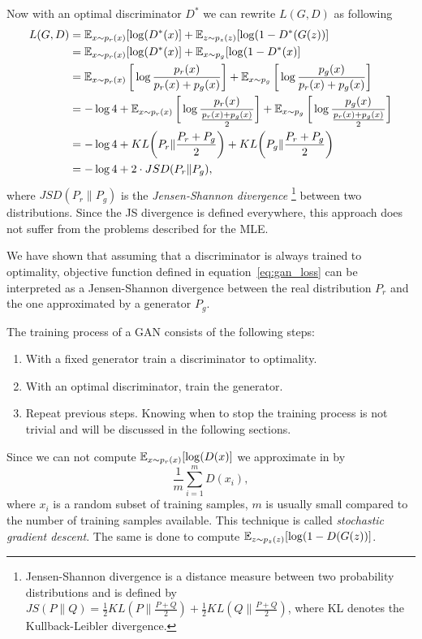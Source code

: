 Now with an optimal discriminator $D^*$ we can rewrite $L(G,D)$ as following
\begin{align*}
	L(G, D) &= \operatorname{\mathbb{E}}_{x \sim p_r(x)} [\log(D^*(x)] + \operatorname{\mathbb{E}}_{z \sim p_z(z)}[\log(1-D^*(G(z))] \\
	&= \operatorname{\mathbb{E}}_{x \sim p_r(x)} [\log(D^*(x)] + \operatorname{\mathbb{E}}_{x \sim p_g}[\log(1-D^*(x)] \\
	&= \operatorname{\mathbb{E}}_{x \sim p_r(x)} \bigg[\log \frac{p_r(x)}{p_r(x) + p_g(x)}\bigg] + \operatorname{\mathbb{E}}_{x \sim p_g}\bigg[\log \frac{p_g(x)}{p_r(x) + p_g(x)}\bigg] \\
	&= -\log 4 + \operatorname{\mathbb{E}}_{x \sim p_r(x)} \bigg[\log \frac{p_r(x)}{\frac{p_r(x) + p_g(x)}{2}}\bigg] + \operatorname{\mathbb{E}}_{x \sim p_g}\bigg[\log \frac{p_g(x)}{\frac{p_r(x) + p_g(x)}{2}}\bigg] \\
	&= -\log 4 + KL\bigg(P_r \lVert \frac{P_r + P_g}{2}\bigg) +  KL\bigg(P_g \lVert \frac{P_r + P_g}{2}\bigg) \\
	&= -\log 4 + 2 \cdot JSD(P_r \lVert P_g),
\end{align*}
where $JSD(P_r \lVert P_g)$ is the \textit{Jensen-Shannon divergence}  \footnote{Jensen-Shannon divergence is a distance measure between two probability distributions and is defined by $JS(P\lVert Q) = \frac{1}{2} KL(P \lVert \frac{P+Q}{2}) +\frac{1}{2} KL(Q \lVert \frac{P+Q}{2})$, where KL denotes the Kullback-Leibler divergence.} between two distributions. Since the JS divergence is defined everywhere, this approach does not suffer from the problems described for the MLE.

We have shown that assuming that a discriminator is always trained to optimality, objective function defined in equation~\ref{eq:gan_loss} can be interpreted as a Jensen-Shannon divergence between the real distribution $P_r$ and the one approximated by a generator $P_g$.  

The training process of a GAN consists of the following steps:
\begin{enumerate}
	\item With a fixed generator train a discriminator to optimality.
	\item With an optimal discriminator, train the generator. 
	\item Repeat previous steps. Knowing when to stop the training process is not trivial and will be discussed in the following sections.
\end{enumerate}
Since we can not compute $\operatorname{\mathbb{E}}_{x \sim p_r(x)} [\log(D(x)]$ we approximate in by 
\begin{equation}
	\frac{1}{m} \sum_{i=1}^{m} D(x_i),
\end{equation}
where $x_i$ is a random subset of training samples, $m$ is usually small compared to the number of training samples available. This technique is called \textit{stochastic gradient descent}. The same is done to compute $\operatorname{\mathbb{E}}_{z \sim p_z(z)}[\log(1-D(G(z))]$.
 
